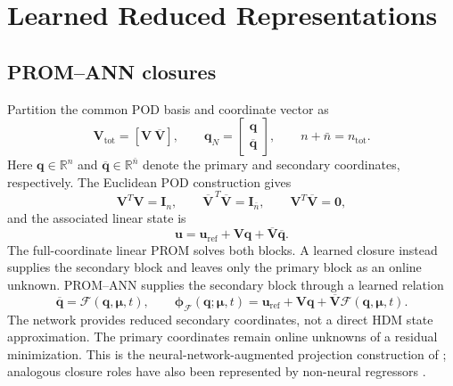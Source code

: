 \documentclass[11pt]{article}
\newcommand{\q}{\mathbf q}
\newcommand{\qbar}{\overline{\mathbf q}}
\newcommand{\qp}{\q}
\newcommand{\qs}{\qbar}
\newcommand{\uvec}{\mathbf u}
\newcommand{\mub}{\bm\mu}
\begin{document}
\section{Learned Reduced Representations}
\label{sec:learned-representations}
\subsection{PROM--ANN closures}
Partition the common POD basis and coordinate vector as
\begin{equation}
\mathbf V_{\mathrm{tot}}=[\mathbf V\ \overline{\mathbf V}],\qquad
\q_N=\begin{bmatrix}\qp\\\qs\end{bmatrix},\qquad
n+\bar n=n_{\mathrm{tot}}.
\label{eq:partition}
\end{equation}
Here $\q\in\mathbb R^n$ and $\qbar\in\mathbb R^{\bar n}$ denote the
primary and secondary coordinates, respectively.  The Euclidean POD
construction gives
\begin{equation}
\mathbf V^T\mathbf V=\mathbf I_n,\qquad
\overline{\mathbf V}^{\,T}\overline{\mathbf V}=\mathbf I_{\bar n},\qquad
\mathbf V^T\overline{\mathbf V}=\mathbf0,
\label{eq:partition-orthogonality}
\end{equation}
and the associated linear state is
\begin{equation}
\uvec=\uvec_{\mathrm{ref}}+\mathbf V\q+
\overline{\mathbf V}\qbar.
\label{eq:partitioned-state}
\end{equation}
The full-coordinate linear PROM solves both blocks.  A learned closure
instead supplies the secondary block and leaves only the primary block as
an online unknown.
PROM--ANN supplies the secondary block through a learned relation
\begin{equation}
\qs=\mathcal F(\qp,\mub,t),\qquad
\boldsymbol\phi_{\mathcal F}(\qp;\mub,t)=\uvec_{\mathrm{ref}}+
\mathbf V\qp+\overline{\mathbf V}\mathcal F(\qp,\mub,t).
\label{eq:closure-manifold}
\end{equation}
The network provides reduced secondary coordinates, not a direct HDM state
approximation.  The primary coordinates remain online unknowns of a residual
minimization.  This is the neural-network-augmented projection construction
of \cite{barnett2023neural}; analogous closure roles have also been
represented by non-neural regressors \cite{ares2026closure}.
\end{document}
